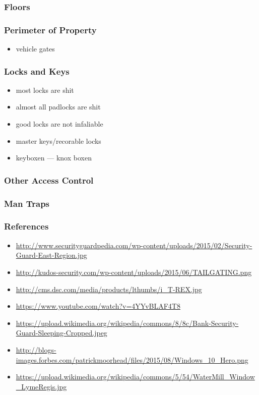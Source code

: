 \documentclass[]{beamer}
\begin{document}
\begin{frame}
  \frametitle{Floors}
\end{frame}

\begin{frame}
  \frametitle{Perimeter of Property}
  \begin{itemize}
    \item vehicle gates
  \end{itemize}
\end{frame}

\begin{frame}
  \frametitle{Locks and Keys}
  \begin{itemize}
    \item most locks are shit
    \item almost all padlocks are shit
    \item good locks are not infaliable
    \item master keys/recorable locks
    \item keyboxen --- knox boxen
  \end{itemize}
\end{frame}

\begin{frame}
  \frametitle{Other Access Control}
\end{frame}

\begin{frame}
  \frametitle{Man Traps}
\end{frame}

\begin{frame}
  \frametitle{References}
  \begin{itemize}
    \item \url{http://www.securityguardpedia.com/wp-content/uploads/2015/02/Security-Guard-East-Region.jpg}
    \item \url{http://kudos-security.com/wp-content/uploads/2015/06/TAILGATING.png}
    \item \url{http://cms.dsc.com/media/products/lthumbs/i_T-REX.jpg}
    \item \url{https://www.youtube.com/watch?v=4YYvBLAF4T8}
    \item \url{https://upload.wikimedia.org/wikipedia/commons/8/8c/Bank-Security-Guard-Sleeping-Cropped.jpeg}
    \item \url{http://blogs-images.forbes.com/patrickmoorhead/files/2015/08/Windows_10_Hero.png}
    \item \url{https://upload.wikimedia.org/wikipedia/commons/5/54/WaterMill_Window_LymeRegis.jpg}
  \end{itemize}

\end{frame}
\end{document}
